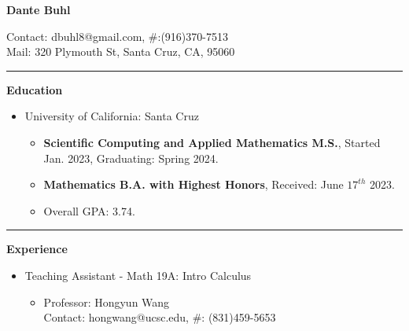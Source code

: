 \documentclass{article}
\begin{document}
{\color{text}
\begin{center}
    \begin{minipage}{.4\textwidth}
        \centering
        \textbf{\LARGE Dante Buhl}
    \end{minipage}
    \begin{minipage}{.55\textwidth}
    \centering
        \footnotesize Contact: dbuhl8@gmail.com, \#:(916)370-7513\\ 
        \footnotesize Mail: 320 Plymouth St, Santa Cruz, CA, 95060\\
    \end{minipage}
\end{center}
\vspace{2pt}
\noindent\textcolor{lines}{\rule{\textwidth}{1pt}}\par
\vspace{10pt} 
\textbf{\Large Education}
\vspace{3pt}
\begin{small}
\begin{itemize}[label = \textcolor{bullets}{}]
    \item{\normalsize University of California: Santa Cruz}
    \begin{itemize}[label = \textcolor{bullets}{}]
        \item{\textbf{Scientific Computing and Applied Mathematics M.S.}, Started Jan. 2023, Graduating: Spring 2024.}
        \item{\textbf{Mathematics B.A. with Highest Honors}, Received: June $17^{th}$ 2023.}
        \item{Overall GPA: 3.74.}
    \end{itemize}
\end{itemize}
\end{small}
\noindent\textcolor{lines}{\rule{\textwidth}{1pt}}\par
\vspace{10pt}
\textbf{\Large Experience}
\vspace{3pt}
\begin{small}
\begin{itemize}[label = \textcolor{bullets}{}]
    \item{\normalsize Teaching Assistant - Math 19A: Intro Calculus}
    \begin{itemize}[label = \textcolor{bullets}{}] 
        \item{Professor: Hongyun Wang\\ Contact: hongwang@ucsc.edu, \#: (831)459-5653}
    \end{itemize}

\end{itemize}
\end{small}}
\end{document}
